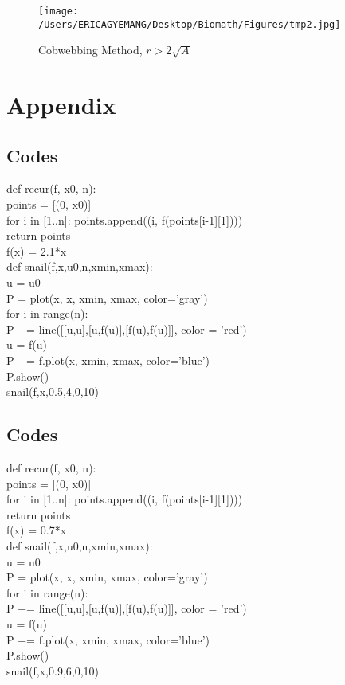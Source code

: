 \documentclass[12pt]{article}
\begin{document}
 
 \cleardoublepage       
 
\begin{figure} [ht!]
 \centering
 \texttt{[image: /Users/ERICAGYEMANG/Desktop/Biomath/Figures/tmp2.jpg]} 
\caption[Figure 5]{Cobwebbing Method, $r>2\sqrt{A}$}
 \label{fig::model}
\end{figure}   
 
 \cleardoublepage        
 
 
 \appendix
\section{Appendix}
 \subsection{Codes}
 
 def recur(f, x0, n):\\ 
    points = [(0, x0)] \\
    for i in [1..n]:
        points.append((i, f(points[i-1][1])))\\ 
    return points\\
f(x) = 2.1*x\\
def snail(f,x,u0,n,xmin,xmax): \\
    u = u0\\
    P = plot(x, x, xmin, xmax, color='gray')\\ 
    for i in range(n):\\
        P += line([[u,u],[u,f(u)],[f(u),f(u)]], color = 'red')\\ 
        u = f(u)\\
        P += f.plot(x, xmin, xmax, color='blue')\\
    P.show() \\
snail(f,x,0.5,4,0,10)\\

 
 \subsection{Codes}
 def recur(f, x0, n):\\ 
    points = [(0, x0)] \\
    for i in [1..n]:
        points.append((i, f(points[i-1][1])))\\ 
    return points\\
f(x) = 0.7*x\\
def snail(f,x,u0,n,xmin,xmax): \\
    u = u0\\
    P = plot(x, x, xmin, xmax, color='gray')\\ 
    for i in range(n):\\
        P += line([[u,u],[u,f(u)],[f(u),f(u)]], color = 'red')\\ 
        u = f(u)\\
        P += f.plot(x, xmin, xmax, color='blue')\\
    P.show() \\
snail(f,x,0.9,6,0,10)\\
\end{document}
